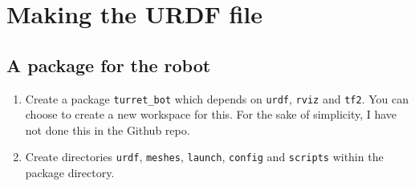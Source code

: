\documentclass{article}
\begin{document}
    \section{Making the URDF file}
        \subsection{A package for the robot}
            \begin{enumerate}
                \item Create a package \texttt{turret\_bot} which depends on \texttt{urdf},
                \texttt{rviz} and \texttt{tf2}. You can choose to create a new workspace for this.
                For the sake of simplicity, I have not done this in the Github repo.
                \item Create directories \texttt{urdf}, \texttt{meshes}, \texttt{launch},
                 \texttt{config} and \texttt{scripts} within the package directory.
            \end{enumerate}
            \newpage
\end{document}
